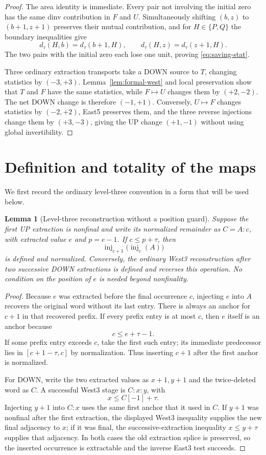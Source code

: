 \documentclass[11pt]{article}
\newtheorem{lemma}[theorem]{Lemma}
\theoremstyle{definition}
\theoremstyle{remark}
\newcommand{\inj}{\operatorname{inj}}
\begin{document}
\begin{proof}
The area identity is immediate.  Every pair not involving the initial zero
has the same dinv contribution in $F$ and $U$.  Simultaneously shifting
$(b,z)$ to $(b+1,z+1)$ preserves their mutual contribution, and for
$H\in\{P,Q\}$ the boundary inequalities give
\[
 d_\tau(H,b)=d_\tau(b+1,H),
 \qquad
 d_\tau(H,z)=d_\tau(z+1,H).
\]
The two pairs with the initial zero each lose one unit, proving
\eqref{eq:saving-stat}.

Three ordinary extraction transports take a DOWN source to $T$, changing
statistics by $(-3,+3)$.  Lemma~\ref{lem:formal-west} and local preservation
show that $T$ and $F$ have the same statistics, while
$F\mapsto U$ changes them by $(+2,-2)$.  The net DOWN change is therefore
$(-1,+1)$.  Conversely, $U\mapsto F$ changes statistics by $(-2,+2)$,
East5 preserves them, and the three reverse injections change them by
$(+3,-3)$, giving the UP change $(+1,-1)$ without using global
invertibility.
\end{proof}

\section{Definition and totality of the maps}

We first record the ordinary level-three convention in a form that will be
used below.

\begin{lemma}[Level-three reconstruction without a position guard]
\label{lem:level3-reconstruction}
Suppose the first UP extraction is nonfinal and write its normalized
remainder as $C=A:c$, with extracted value $e$ and $p=e-1$.  If
$c\le p+\tau$, then
\[
 \inj_{c+1}\bigl(\inj_e(A)\bigr)
\]
is defined and normalized.  Conversely, the ordinary West3 reconstruction
after two successive DOWN extractions is defined and reverses this
operation.  No condition on the position of $e$ is needed beyond
nonfinality.
\end{lemma}

\begin{proof}
Because $e$ was extracted before the final occurrence $c$, injecting $e$
into $A$ recovers the original word without its last entry.  There is always
an anchor for $c+1$ in that recovered prefix.  If every prefix entry is at
most $c$, then $e$ itself is an anchor because
\[
 c\le e+\tau-1.
\]
If some prefix entry exceeds $c$, take the first such entry; its immediate
predecessor lies in $[c+1-\tau,c]$ by normalization.  Thus inserting $c+1$
after the first anchor is normalized.

For DOWN, write the two extracted values as $x+1,y+1$ and the twice-deleted
word as $C$.  A successful West3 stage is $C:x:y$, with
\[
 x\le C[-1]+\tau.
\]
Injecting $y+1$ into $C:x$ uses the same first anchor that it used in $C$.
If $y+1$ was nonfinal after the first extraction, the displayed West3
inequality supplies the new final adjacency to $x$; if it was final, the
successive-extraction inequality $x\le y+\tau$ supplies that adjacency.
In both cases the old extraction splice is preserved, so the inserted
occurrence is extractable and the inverse East3 test succeeds.
\end{proof}
\end{document}
